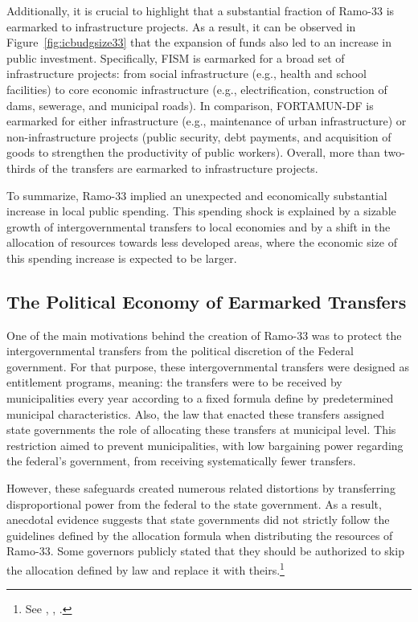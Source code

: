 \documentclass[dv_diss_main.tex]{subfiles}
\begin{document}
Additionally, it is crucial to highlight that a substantial fraction of Ramo-33 is earmarked to infrastructure projects. As a result, it can be observed in Figure~\ref{fig:icbudgsize33} that the expansion of funds also led to an increase in public investment. Specifically, FISM is earmarked for a broad set of infrastructure projects: from social infrastructure (e.g., health and school facilities) to core economic infrastructure (e.g., electrification, construction of dams, sewerage, and municipal roads). In comparison, FORTAMUN-DF is earmarked for either infrastructure (e.g., maintenance of urban infrastructure) or non-infrastructure projects (public security, debt payments, and acquisition of goods to strengthen the productivity of public workers). Overall, more than two-thirds of the transfers are earmarked to infrastructure projects.  

To summarize, Ramo-33 implied an unexpected and economically substantial increase in local public spending. This spending shock is explained by a sizable growth of intergovernmental transfers to local economies and by a shift in the allocation of resources towards less developed areas, where the economic size of this spending increase is expected to be larger.



\subsection{The Political Economy of Earmarked Transfers}

One of the main motivations behind the creation of Ramo-33 was to protect the intergovernmental transfers from the political discretion of the Federal government. 
For that purpose, these intergovernmental transfers were designed as entitlement programs, meaning: the transfers were to be received by municipalities every year according to a fixed formula define by predetermined municipal characteristics. 
Also, the law that enacted these transfers assigned state governments the role of allocating these transfers at municipal level.  
This restriction aimed to prevent municipalities, with low bargaining power regarding the federal's government, from receiving systematically fewer transfers.

However, these safeguards created numerous related distortions by transferring disproportional power from the federal to the state government. 
As a result, anecdotal evidence suggests that state governments did not strictly follow the guidelines defined by the allocation formula when distributing the resources of Ramo-33. 
Some governors publicly stated that they should be authorized to skip the allocation defined by law and replace it with theirs.\footnote{See \cite{diaz2004descentralizacion}, \cite{trillo2007transferences}, \citep{langston2010governors}.}
\end{document}
